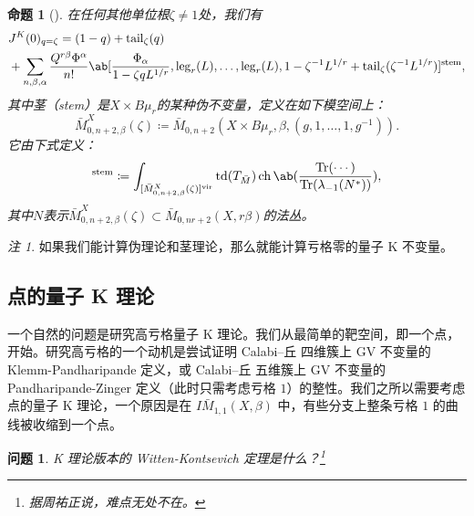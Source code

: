 \documentclass{amsart}
\newtheorem{prop}[thm]{命题}
\newtheorem{quest}[thm]{问题}
\theoremstyle{definition}
\theoremstyle{remark}
\newtheorem{rmk}[thm]{注}
\theoremstyle{plain}
\theoremstyle{definition}
\theoremstyle{remark}
\newcommand{\mr}[1]{\mathrm{#1}}
\newcommand{\on}[1]{\operatorname{#1}}
\newcommand{\1}{\mathbf{1}}
\newcommand{\2}{\mathbf{2}}
\newcommand{\3}{\mathbf{3}}
\newcommand{\vir}{\mr{vir}}
\begin{document}
\begin{prop}[{\cite{GiventalTonita2014}}]
    在任何其他单位根\(\zeta \neq 1\)处，我们有
    \begin{align*}
        &J^K(0)_{q = \zeta} = (1-q) + \mr{tail}_{\zeta}(q) \\
        &+ \sum_{n,\beta,\alpha} \frac{Q^{r\beta}\Phi^{\alpha}}{n!} \ab[\frac{\Phi_{\alpha}}{1-\zeta q L^{1/r}}, \mr{leg}_r(L), \ldots, \mr{leg}_r(L), 1 - \zeta^{-1}L^{1/r} + \mr{tail}_{\zeta}(\zeta^{-1} L^{1/r})]^{\mr{stem}},
    \end{align*}
    其中茎（stem）是\(X \times B\mu_r\)的某种伪不变量，定义在如下模空间上：
    \[ \bar{M}_{0,n+2,\beta}^X(\zeta) \coloneqq \bar{M}_{0,n+2}(X \times B\mu_r, \beta, (g, 1, \ldots, 1, g^{-1})). \]
    它由下式定义：
    \begin{align*}
        [\cdots]^{\mr{stem}} \coloneqq \int_{[\bar{M}_{0,n+2,\beta}^X(\zeta)]^{\vir}} \on{td}(T_{\bar{M}}) \on{ch}\ab(\frac{\on{Tr}(\cdots)}{\on{Tr}(\lambda_{-1}(N^*))}), 
    \end{align*}
    其中\(N\)表示\(\bar{M}_{0,n+2,\beta}^X(\zeta) \subset \bar{M}_{0,nr+2}(X, r\beta)\)的法丛。
\end{prop}

\begin{rmk}
    如果我们能计算伪理论和茎理论，那么就能计算亏格零的量子 K 不变量。
\end{rmk}

\subsection{点的量子 K 理论}%
\label{sub:Quantum K-theory of a point}

一个自然的问题是研究高亏格量子 K 理论。我们从最简单的靶空间，即一个点，开始。研究高亏格的一个动机是尝试证明 Calabi--丘 四维簇上 GV 不变量的 Klemm-Pandharipande 定义，或 Calabi--丘 五维簇上 GV 不变量的 Pandharipande-Zinger 定义（此时只需考虑亏格 \(1\)）的整性。我们之所以需要考虑点的量子 K 理论，一个原因是在 \(I\bar{M}_{1,1}(X, \beta)\) 中，有些分支上整条亏格 \(1\) 的曲线被收缩到一个点。

\begin{quest}
    K 理论版本的 Witten-Kontsevich 定理是什么？\footnote{据周祐正说，难点无处不在。}
\end{quest}
\end{document}
